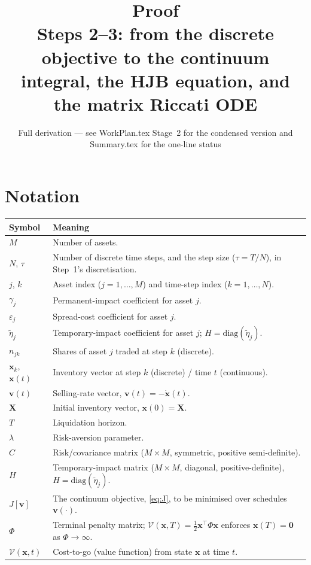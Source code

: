 \documentclass[11pt,a4paper]{article}
\title{\textbf{Proof} \\ \large Steps 2--3: from the discrete objective to the
continuum integral, the HJB equation, and the matrix Riccati ODE}
\author{Full derivation --- see WorkPlan.tex Stage~2 for the condensed version
and Summary.tex for the one-line status}
\date{}
\begin{document}
\maketitle

\section*{Notation}

\begin{center}
\begin{tabular}{@{}L{2.1cm}L{12.5cm}@{}}
\toprule
\textbf{Symbol} & \textbf{Meaning} \\
\midrule
$M$ & Number of assets. \\
$N$, $\tau$ & Number of discrete time steps, and the step size ($\tau=T/N$), in Step~1's discretisation. \\
$j$, $k$ & Asset index ($j=1,\dots,M$) and time-step index ($k=1,\dots,N$). \\
$\gamma_j$ & Permanent-impact coefficient for asset $j$. \\
$\varepsilon_j$ & Spread-cost coefficient for asset $j$. \\
$\tilde\eta_j$ & Temporary-impact coefficient for asset $j$; $H=\mathrm{diag}(\tilde\eta_j)$. \\
$n_{jk}$ & Shares of asset $j$ traded at step $k$ (discrete). \\
$\mathbf x_k$, $\mathbf x(t)$ & Inventory vector at step $k$ (discrete) / time $t$ (continuous). \\
$\mathbf v(t)$ & Selling-rate vector, $\mathbf v(t)=-\dot{\mathbf x}(t)$. \\
$\mathbf X$ & Initial inventory vector, $\mathbf x(0)=\mathbf X$. \\
$T$ & Liquidation horizon. \\
$\lambda$ & Risk-aversion parameter. \\
$C$ & Risk/covariance matrix ($M\times M$, symmetric, positive semi-definite). \\
$H$ & Temporary-impact matrix ($M\times M$, diagonal, positive-definite), $H=\mathrm{diag}(\tilde\eta_j)$. \\
$J[\mathbf v]$ & The continuum objective, \eqref{eq:J}, to be minimised over schedules $\mathbf v(\cdot)$. \\
$\Phi$ & Terminal penalty matrix; $\mathcal V(\mathbf x,T)=\tfrac12\mathbf x^\top\Phi\mathbf x$ enforces $\mathbf x(T)=\mathbf 0$ as $\Phi\to\infty$. \\
$\mathcal V(\mathbf x,t)$ & Cost-to-go (value function) from state $\mathbf x$ at time $t$. \\

\end{tabular}
\end{center}
\end{document}
